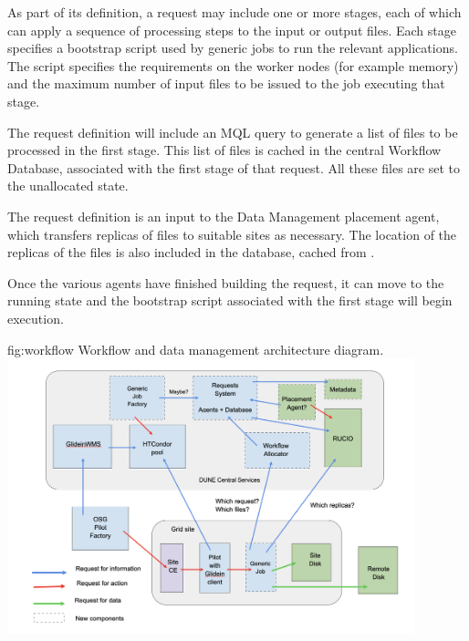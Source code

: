 \documentclass[../main-v1.tex]{subfiles}
\begin{document}
As part of its definition, a request may include one or more stages, each of which can apply a sequence of processing steps to the input or output files. %
Each stage specifies a bootstrap script used by generic jobs to run the relevant applications. The script specifies the requirements on the worker nodes %
(for example memory) and the maximum number of input files to be issued to %
the job executing that stage.

The %
request definition will include an  MQL query %
to generate a list of files to be processed in the first stage. This list of files is cached in the central Workflow Database, associated with the first stage of that request. All these files are set to the unallocated state. 

The request definition is an input to the Data Management placement agent, which transfers replicas of files to suitable sites as necessary. %
The location of the replicas of the files is also included in the database, cached from . 

Once the various agents have finished building the request, it can move to the running state and the bootstrap script associated with the first stage will begin execution. %


\begin{dunefigure}
{fig:workflow} 
{Workflow and data management architecture diagram.}
\includegraphics[height=8cm]{graphics/Workflow/wfs.png}
\end{dunefigure}
\end{document}
